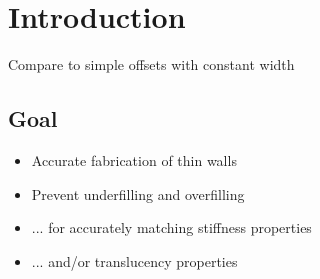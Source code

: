 \section{Introduction}

Compare to simple offsets with constant width

\subsection{Goal}
\begin{itemize}
\item Accurate fabrication of thin walls
\item Prevent underfilling and overfilling
\item ... for accurately matching stiffness properties
\item ... and/or translucency properties
\end{itemize}